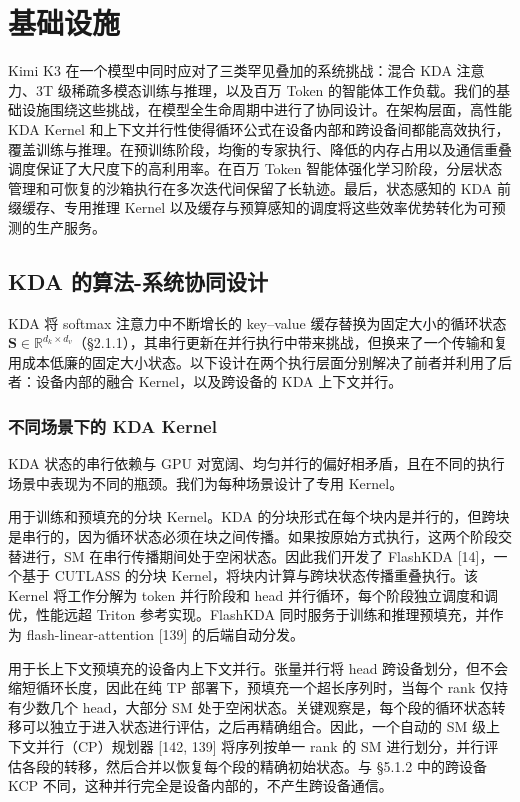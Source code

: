 \section{基础设施}\label{infrastructure}

Kimi K3 在一个模型中同时应对了三类罕见叠加的系统挑战：混合 KDA 注意力、3T 级稀疏多模态训练与推理，以及百万 Token 的智能体工作负载。我们的基础设施围绕这些挑战，在模型全生命周期中进行了协同设计。在架构层面，高性能 KDA Kernel 和上下文并行性使得循环公式在设备内部和跨设备间都能高效执行，覆盖训练与推理。在预训练阶段，均衡的专家执行、降低的内存占用以及通信重叠调度保证了大尺度下的高利用率。在百万 Token 智能体强化学习阶段，分层状态管理和可恢复的沙箱执行在多次迭代间保留了长轨迹。最后，状态感知的 KDA 前缀缓存、专用推理 Kernel 以及缓存与预算感知的调度将这些效率优势转化为可预测的生产服务。

\subsection{KDA 的算法-系统协同设计}\label{algorithm-system-co-design-for-kda}

KDA 将 softmax 注意力中不断增长的 key--value 缓存替换为固定大小的循环状态 \(\mathbf { S } \in \mathbb { R } ^ { d _ { k } \times d _ { v } }\)（§2.1.1），其串行更新在并行执行中带来挑战，但换来了一个传输和复用成本低廉的固定大小状态。以下设计在两个执行层面分别解决了前者并利用了后者：设备内部的融合 Kernel，以及跨设备的 KDA 上下文并行。

\subsubsection{不同场景下的 KDA Kernel}\label{kda-kernels-across-regimes}

KDA 状态的串行依赖与 GPU 对宽阔、均匀并行的偏好相矛盾，且在不同的执行场景中表现为不同的瓶颈。我们为每种场景设计了专用 Kernel。

用于训练和预填充的分块 Kernel。KDA 的分块形式在每个块内是并行的，但跨块是串行的，因为循环状态必须在块之间传播。如果按原始方式执行，这两个阶段交替进行，SM 在串行传播期间处于空闲状态。因此我们开发了 FlashKDA {[}14{]}，一个基于 CUTLASS 的分块 Kernel，将块内计算与跨块状态传播重叠执行。该 Kernel 将工作分解为 token 并行阶段和 head 并行循环，每个阶段独立调度和调优，性能远超 Triton 参考实现。FlashKDA 同时服务于训练和推理预填充，并作为 flash-linear-attention {[}139{]} 的后端自动分发。

用于长上下文预填充的设备内上下文并行。张量并行将 head 跨设备划分，但不会缩短循环长度，因此在纯 TP 部署下，预填充一个超长序列时，当每个 rank 仅持有少数几个 head，大部分 SM 处于空闲状态。关键观察是，每个段的循环状态转移可以独立于进入状态进行评估，之后再精确组合。因此，一个自动的 SM 级上下文并行（CP）规划器 {[}142, 139{]} 将序列按单一 rank 的 SM 进行划分，并行评估各段的转移，然后合并以恢复每个段的精确初始状态。与 §5.1.2 中的跨设备 KCP 不同，这种并行完全是设备内部的，不产生跨设备通信。

